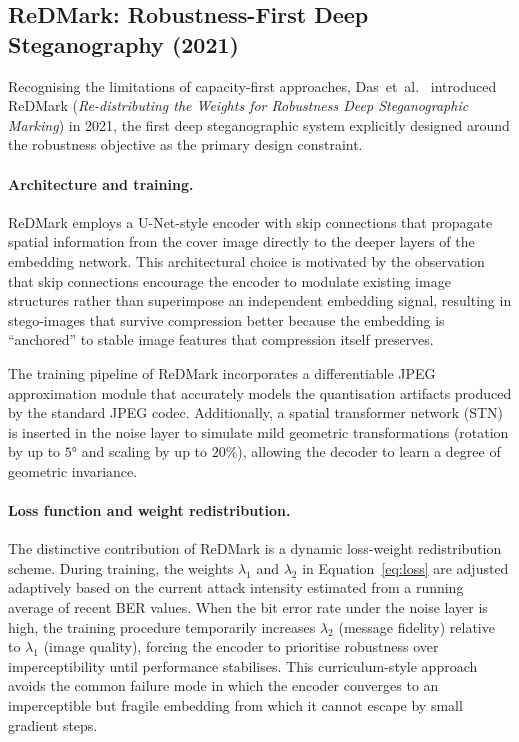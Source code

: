 \documentclass[12pt,a4paper,oneside]{report}
\begin{document}
	\subsection{ReDMark: Robustness-First Deep Steganography (2021)}
	\label{subsec:redmark}
	
	Recognising the limitations of capacity-first approaches, Das~et~al.\ \cite{das2021redmark}
	introduced ReDMark (\textit{Re-distributing the Weights for Robustness Deep Steganographic
		Marking}) in 2021, the first deep steganographic system explicitly designed around the
	robustness objective as the primary design constraint.
	
	\paragraph{Architecture and training.}
	ReDMark employs a U-Net-style encoder \cite{ronneberger2015unet} with skip connections that
	propagate spatial information from the cover image directly to the deeper layers of the embedding
	network. This architectural choice is motivated by the observation that skip connections encourage
	the encoder to modulate existing image structures rather than superimpose an independent embedding
	signal, resulting in stego-images that survive compression better because the embedding is
	``anchored'' to stable image features that compression itself preserves.
	
	The training pipeline of ReDMark incorporates a differentiable JPEG approximation module
	\cite{shin2017jpeg} that accurately models the quantisation artifacts produced by the standard
	JPEG codec. Additionally, a spatial transformer network (STN) \cite{jaderberg2015spatial} is
	inserted in the noise layer to simulate mild geometric transformations (rotation by up to $5°$
	and scaling by up to $20\%$), allowing the decoder to learn a degree of geometric invariance.
	
	\paragraph{Loss function and weight redistribution.}
	The distinctive contribution of ReDMark is a dynamic loss-weight redistribution scheme.
	During training, the weights $\lambda_1$ and $\lambda_2$ in Equation~\eqref{eq:loss} are
	adjusted adaptively based on the current attack intensity estimated from a running average of
	recent BER values. When the bit error rate under the noise layer is high, the training procedure
	temporarily increases $\lambda_2$ (message fidelity) relative to $\lambda_1$ (image quality),
	forcing the encoder to prioritise robustness over imperceptibility until performance stabilises.
	This curriculum-style approach avoids the common failure mode in which the encoder converges to
	an imperceptible but fragile embedding from which it cannot escape by small gradient steps.
	
\end{document}
